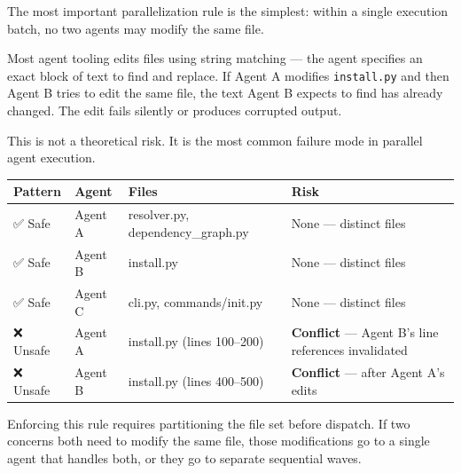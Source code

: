 \documentclass[
  a4paper,
  DIV=11,
  numbers=noendperiod]{scrreprt}
\newcounter{none} %
\begin{document}
The most important parallelization rule is the simplest: within a single
execution batch, no two agents may modify the same file.

Most agent tooling edits files using string matching --- the agent
specifies an exact block of text to find and replace. If Agent A
modifies \texttt{install.py} and then Agent B tries to edit the same
file, the text Agent B expects to find has already changed. The edit
fails silently or produces corrupted output.

This is not a theoretical risk. It is the most common failure mode in
parallel agent execution.

{\def\LTcaptype{none} %
\begin{longtable}[]{@{}
  >{\raggedright\arraybackslash}p{}
  >{\raggedright\arraybackslash}p{}
  >{\raggedright\arraybackslash}p{}
  >{\raggedright\arraybackslash}p{}@{}}
\toprule\noalign{}
\begin{minipage}[b]{\linewidth}\raggedright
Pattern
\end{minipage} & \begin{minipage}[b]{\linewidth}\raggedright
Agent
\end{minipage} & \begin{minipage}[b]{\linewidth}\raggedright
Files
\end{minipage} & \begin{minipage}[b]{\linewidth}\raggedright
Risk
\end{minipage} \\
\midrule\noalign{}
\endhead
\bottomrule\noalign{}
\endlastfoot
✅ Safe & Agent A & resolver.py, dependency\_graph.py & None ---
distinct files \\
✅ Safe & Agent B & install.py & None --- distinct files \\
✅ Safe & Agent C & cli.py, commands/init.py & None --- distinct
files \\
❌ Unsafe & Agent A & install.py (lines 100--200) & \textbf{Conflict}
--- Agent B's line references invalidated \\
❌ Unsafe & Agent B & install.py (lines 400--500) & \textbf{Conflict}
--- after Agent A's edits \\
\end{longtable}
}

Enforcing this rule requires partitioning the file set before dispatch.
If two concerns both need to modify the same file, those modifications
go to a single agent that handles both, or they go to separate
sequential waves.
\end{document}
